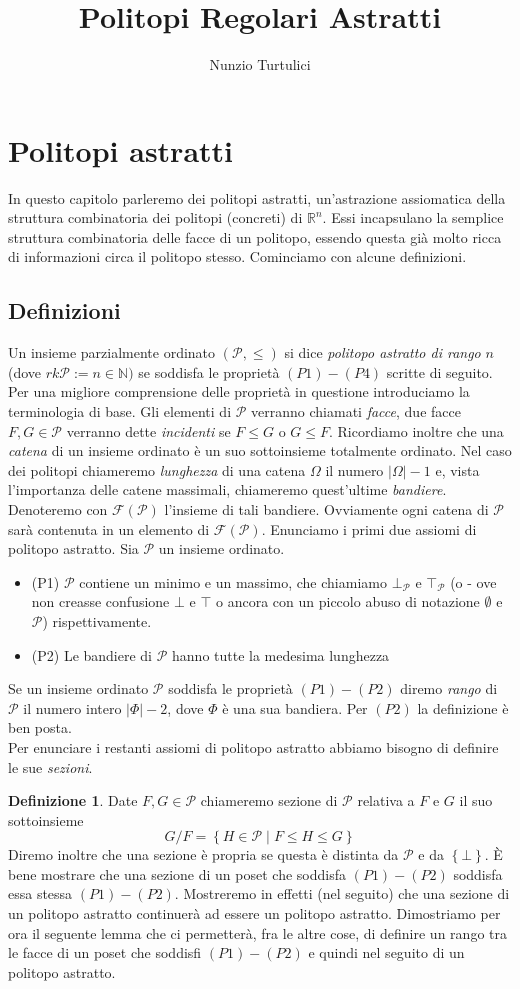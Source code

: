 \documentclass[a4paper,12pt]{report}
\author{Nunzio Turtulici}
\title{Politopi Regolari Astratti}
\newcommand{\Rn}{\mathbb{R}^n}
\newcommand{\p}{\mathcal{P}}
\theoremstyle{plain}
\theoremstyle{definition}
\newtheorem{defin}[teo]{Definizione}
\begin{document}
\section{Politopi astratti}
In questo capitolo parleremo dei politopi astratti, un'astrazione assiomatica della struttura combinatoria dei politopi (concreti) di $\Rn$.
Essi incapsulano la
semplice struttura combinatoria delle facce di un politopo, essendo questa gi\`a molto ricca di informazioni circa il politopo stesso. Cominciamo con alcune 
definizioni.
\subsection{Definizioni}
Un insieme parzialmente ordinato $(\p,\leq)$ si dice \emph{politopo astratto di rango} $n$ (dove $rk\p:=n\in\mathbb{N})$ se soddisfa le
propriet\`a $(P1)-(P4)$ scritte 
di seguito. Per una migliore comprensione delle propriet\`a in questione introduciamo la terminologia di base. Gli elementi di $\p$ verranno
chiamati \emph{facce},
due facce $F,G\in\p$ verranno dette \emph{incidenti} se $F\leq G$ o $G\leq F$. Ricordiamo inoltre che una \emph{catena} di un insieme ordinato \`e un suo 
sottoinsieme totalmente ordinato. Nel caso dei politopi chiameremo \emph{lunghezza} di una catena $\Omega$ il numero $\left|\Omega\right|-1$ e, vista
l'importanza delle catene massimali, chiameremo quest'ultime \emph{bandiere}.
Denoteremo con $\mathcal{F}(\p)$ l'insieme di tali bandiere. Ovviamente ogni catena di $\p$ sar\`a contenuta in un elemento di $\mathcal{F}(\p)$.
Enunciamo i primi due assiomi di politopo astratto. Sia $\p$ un insieme ordinato.
\begin{itemize}
\item (P1) $\p$ contiene un minimo e un massimo, che chiamiamo $\bot_\p$ e $\top_\p$ (o - ove non creasse confusione $\bot$ e $\top$ o ancora
con un piccolo abuso di notazione $\emptyset$ e $\p$) rispettivamente.
\item (P2) Le bandiere di $\p$ hanno tutte la medesima lunghezza
\end{itemize}
Se un insieme ordinato $\p$ soddisfa le propriet\`a $(P1)-(P2)$ diremo \emph{rango} di $\p$ il numero intero  $\left|\Phi\right|-2$, dove
$\Phi$ \`e una sua bandiera. Per $(P2)$ la definizione \`e ben posta.\\
Per enunciare i restanti assiomi di politopo astratto abbiamo bisogno di definire le sue \emph{sezioni}.
\begin{defin}
Date $F,G\in\p$ chiameremo sezione di $\p$ relativa a $F$ e $G$ il suo sottoinsieme
\begin{equation*}
G/F=\left\{H\in\p\mid F\leq H\leq G\right\}
\end{equation*}
Diremo inoltre che una sezione \`e propria se questa \`e distinta da $\p$ e da $\left\{\bot\right\}$.
\`E bene mostrare che una sezione di un poset che soddisfa $(P1)-(P2)$ soddisfa essa stessa $(P1)-(P2)$. Mostreremo in effetti (nel seguito) che una sezione
 di un politopo astratto continuer\`a ad essere un politopo astratto. Dimostriamo per ora il seguente lemma che ci permetter\`a, fra le altre cose,
 di definire un rango tra le facce di un poset che soddisfi $(P1)-(P2)$ e quindi nel seguito di un politopo astratto.
\end{defin}
\end{document}
